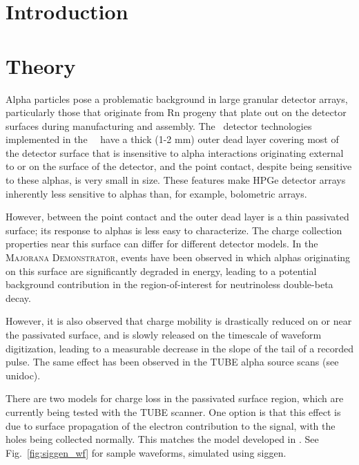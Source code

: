 \section{Introduction}


\section{Theory}
Alpha particles pose a problematic background in large granular detector arrays, particularly those that originate from Rn progeny that plate out on the detector surfaces during manufacturing and assembly. The \ppc\ detector technologies implemented in the \MJ\ \DEM\ have a thick (1-2 mm) outer dead layer covering most of the detector surface that is insensitive to alpha interactions originating external to or on the surface of the detector, and the point contact, despite being sensitive to these alphas, is very small in size. These features make HPGe detector arrays inherently less sensitive to alphas than, for example, bolometric arrays. 

However, between the point contact and the outer dead layer is a thin passivated surface; its response to alphas is less easy to characterize. The charge collection properties near this surface can differ for different detector models. In the \textsc{Majorana Demonstrator}, events have been observed in which alphas originating on this surface are significantly degraded in energy, leading to a potential background contribution in the region-of-interest for neutrinoless double-beta decay. 

However, it is also observed that charge mobility is drastically reduced on or near the passivated surface, and is slowly released on the timescale of waveform digitization, leading to a measurable decrease in the slope of the tail of a recorded pulse. The same effect has been observed in the TUBE alpha source scans (see unidoc).

There are two models for charge loss in the passivated surface region, which are currently being tested with the TUBE scanner. One option is that this effect is due to surface propagation of the electron contribution to the signal, with the holes being collected normally. This matches the model developed in \cite{Mullowney2012}. See Fig.~\ref{fig:siggen_wf} for sample waveforms, simulated using siggen. 

